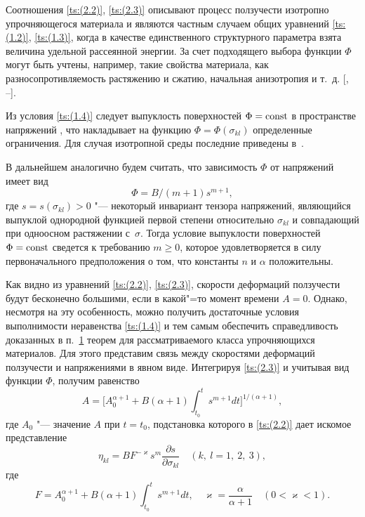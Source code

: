 Соотношения \eqref{ts:(2.2)}, \eqref{ts:(2.3)} описывают процесс ползучести изотропно упрочняющегося материала и являются частным случаем общих уравнений \eqref{ts:(1.2)}, \eqref{ts:(1.3)}, когда в качестве единственного структурного параметра взята величина удельной рассеянной энергии. 
За счет подходящего выбора функции $\Phi$ могут быть учтены, например,  такие свойства материала, как разносопротивляемость растяжению и сжатию, начальная анизотропия и т.~д. [, --].

Из условия \eqref{ts:(1.4)} следует выпуклость поверхностей $\Phi=\rm const$ в пространстве напряжений \cite{ts:Tsvelodub:1}, что накладывает на функцию $\Phi=\Phi(\sigma_{kl})$ определенные ограничения. 
Для случая изотропной среды последние приведены в~\cite{ts:Tsvelodub:3}.

В дальнейшем аналогично \cite{ts:Rabotnov} будем считать, что зависимость $\Phi$ от напряжений имеет вид 
$$\Phi=B/(m+1)s^{m+1},$$ 
где $s=s(\sigma_{kl})>0$ "--- некоторый инвариант тензора напряжений, являющийся выпуклой однородной функцией первой степени относительно $\sigma_{kl}$ и совпадающий при одноосном растяжении с~$\sigma$. 
Тогда условие выпуклости поверхностей $\Phi=\rm const$ сведется к требованию $m\geq0$, которое удовлетворяется в силу первоначального предположения о том, что константы $n$ и $\alpha$ положительны.

Как видно из уравнений \eqref{ts:(2.2)}, \eqref{ts:(2.3)}, скорости деформаций ползучести будут бесконечно большими, если в какой"=то момент времени $A=0$. 
Однако, несмотря на эту особенность, можно получить достаточные условия выполнимости неравенства  \eqref{ts:(1.4)} и тем самым обеспечить справедливость доказанных в п.~\hyperlink{ts:1}{1} теорем для рассматриваемого класса упрочняющихся материалов. Для этого представим связь между скоростями деформаций ползучести и напряжениями в явном виде. Интегрируя \eqref{ts:(2.3)}  и учитывая вид функции $\Phi$, получим равенство
$$A=\biggl[A_{0}^{\alpha+1}+B(\alpha+1) \int_{t_{0}}^{t}s^{m+1}dt\biggr]^{1/(\alpha+1)},
$$
где $A_{0}$ "--- значение $A$ при $t=t_{0}$, подстановка которого в \eqref{ts:(2.2)} дает искомое представление
\begin{equation}
\eta_{kl}=BF^{-\varkappa}s^{m} \frac{\partial s}{\partial\sigma_{kl}}\quad (k,\:l=1,\:2,\:3),
\label{ts:(2.4)}
\end{equation}
где
$$
F=A_{0}^{\alpha+1}+B(\alpha+1)\int_{t_{0}}^{t}s^{m+1}dt,\quad  \varkappa=\frac{\alpha}{\alpha+1}\quad  (0<\varkappa<1).
$$

